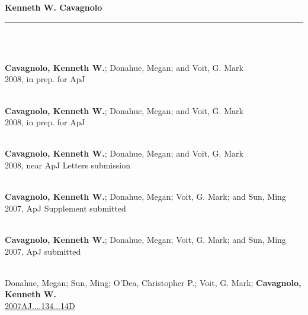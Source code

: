 \documentclass[11pt]{cv}
\begin{document}
\begin{center}
{\huge \textbf{\sc Kenneth W. Cavagnolo}}\\
\rule{17.35cm}{1pt}\\
\end{center}
\normalsize

\begin{llist}



{}\\
{\bf Cavagnolo, Kenneth W.}; Donahue, Megan; and Voit, G. Mark\\
2008, in prep. for ApJ

{}\\
{\bf Cavagnolo, Kenneth W.}; Donahue, Megan; and Voit, G. Mark\\
2008, in prep. for ApJ

{}\\
{\bf Cavagnolo, Kenneth W.}; Donahue, Megan; and Voit, G. Mark\\
2008, near ApJ Letters submission

{}\\
{\bf Cavagnolo, Kenneth W.}; Donahue, Megan; Voit, G. Mark; and Sun, Ming\\
2007, ApJ Supplement submitted

{}\\
{\bf Cavagnolo, Kenneth W.}; Donahue, Megan; Voit, G. Mark; and Sun, Ming\\
2007, ApJ submitted



{}\\
Donahue, Megan; Sun, Ming; O'Dea, Christopher P.; Voit, G. Mark; {\bf Cavagnolo, Kenneth W.}\\
\href{http://adsabs.harvard.edu/abs/2007AJ....134...14D}{2007AJ....134...14D}


\end{llist}
\end{document}
